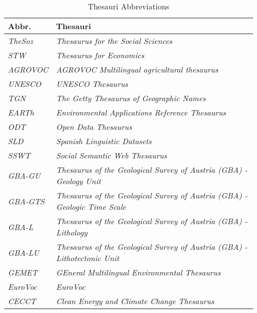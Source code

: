 \documentclass{llncs}
\begin{document}
\begin{table}[H]
	\centering
		\begin{tabular}{l|l}
      \textbf{Abbr.} & \textbf{Thesauri} \\		
      \hline
    \emph{TheSoz} & \emph{Thesaurus for the Social Sciences}\tablefootnote{\url{http://www.gesis.org/en/services/research/thesauri-und-klassifikationen/social-science-thesaurus/}} \\
	  \emph{STW} & \emph{Thesaurus for Economics}\tablefootnote{\url{http://zbw.eu/stw/versions/latest/about}} \\
	  \emph{AGROVOC} & \emph{AGROVOC Multilingual agricultural thesaurus}\tablefootnote{\url{http://202.45.139.84:10035/catalogs/fao/repositories/agrovoc}} \\
		\emph{UNESCO} & \emph{UNESCO Thesaurus}\tablefootnote{\url{http://skos.um.es/sparql/}} \\
		\emph{TGN} & \emph{The Getty Thesaurus of Geographic Names}\tablefootnote{\url{http://vocab.getty.edu/sparql}} \\
		\emph{EARTh} & \emph{Environmental Applications Reference Thesaurus}\tablefootnote{\url{http://linkeddata.ge.imati.cnr.it/resource/EARTh/}} \\
		\emph{ODT} & \emph{Open Data Thesaurus}\tablefootnote{\url{http://vocabulary.semantic-web.at/PoolParty/wiki/OpenData}} \\
		\emph{SLD} & \emph{Spanish Linguistic Datasets}\tablefootnote{\url{http://linguistic.linkeddata.es}} \\
		\emph{SSWT} & \emph{Social Semantic Web Thesaurus}\tablefootnote{\url{http://vocabulary.semantic-web.at/PoolParty/wiki/semweb}} \\
		\emph{GBA-GU} & \emph{Thesaurus of the Geological Survey of Austria (GBA) - Geology Unit}\tablefootnote{\url{http://resource.geolba.ac.at/}} \\
		\emph{GBA-GTS} & \emph{Thesaurus of the Geological Survey of Austria (GBA) - Geologic Time Scale}\tablefootnote{\url{http://resource.geolba.ac.at/}} \\
		\emph{GBA-L} & \emph{Thesaurus of the Geological Survey of Austria (GBA) - Lithology}\tablefootnote{\url{http://resource.geolba.ac.at/}} \\
		\emph{GBA-LU} & \emph{Thesaurus of the Geological Survey of Austria (GBA) - Lithotectonic Unit}\tablefootnote{\url{http://resource.geolba.ac.at/}} \\
		\emph{GEMET} & \emph{GEneral Multilingual Environmental Thesaurus}\tablefootnote{\url{http://www.eionet.europa.eu/gemet/}} \\
		\emph{EuroVoc} & \emph{EuroVoc}\tablefootnote{\url{http://open-data.europa.eu/de/data/dataset/eurovoc}} \\
		\emph{CECCT} & \emph{Clean Energy and Climate Change Thesaurus}\tablefootnote{\url{http://data.reegle.info/thesaurus/guide}} \\
		\end{tabular}
	\caption{Thesauri Abbreviations}
	\label{tab:thesauri-abbreviations}
\end{table}
\end{document}
